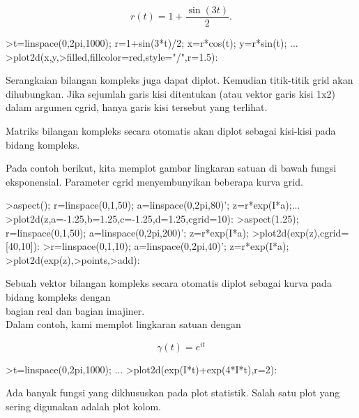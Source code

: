 \documentclass[a4paper,10pt]{article}
\begin{document}
\begin{eulernotebook}
\begin{eulercomment}
\begin{eulercomment}
\begin{eulercomment}
\begin{eulercomment}
\begin{eulercomment}
\begin{eulercomment}
\begin{eulercomment}
\begin{eulercomment}
\begin{eulercomment}
\begin{eulercomment}
\begin{eulercomment}
\end{eulercomment}
\begin{eulerformula}
\[
r(t) = 1 + \dfrac{\sin(3t)}{2}.
\]
\end{eulerformula}
\begin{eulerprompt}
>t=linspace(0,2pi,1000); r=1+sin(3*t)/2; x=r*cos(t); y=r*sin(t); ...
>plot2d(x,y,>filled,fillcolor=red,style="/",r=1.5):
\end{eulerprompt}
\begin{eulercomment}
Serangkaian bilangan kompleks juga dapat diplot. Kemudian titik-titik
grid akan dihubungkan. Jika sejumlah garis kisi ditentukan (atau
vektor garis kisi 1x2) dalam argumen cgrid, hanya garis kisi tersebut
yang terlihat.

Matriks bilangan kompleks secara otomatis akan diplot sebagai
kisi-kisi pada bidang kompleks.

Pada contoh berikut, kita memplot gambar lingkaran satuan di bawah
fungsi eksponensial. Parameter cgrid menyembunyikan beberapa kurva
grid.
\end{eulercomment}
\begin{eulerprompt}
>aspect(); r=linspace(0,1,50); a=linspace(0,2pi,80)'; z=r*exp(I*a);...
>plot2d(z,a=-1.25,b=1.25,c=-1.25,d=1.25,cgrid=10):
>aspect(1.25); r=linspace(0,1,50); a=linspace(0,2pi,200)'; z=r*exp(I*a);
>plot2d(exp(z),cgrid=[40,10]):
>r=linspace(0,1,10); a=linspace(0,2pi,40)'; z=r*exp(I*a);
>plot2d(exp(z),>points,>add):
\end{eulerprompt}
\begin{eulercomment}
Sebuah vektor bilangan kompleks secara otomatis diplot sebagai kurva
pada bidang kompleks dengan\\
bagian real dan bagian imajiner.\\
Dalam contoh, kami memplot lingkaran satuan dengan

\end{eulercomment}
\begin{eulerformula}
\[
\gamma(t) = e^{it}
\]
\end{eulerformula}
\begin{eulerprompt}
>t=linspace(0,2pi,1000); ...
>plot2d(exp(I*t)+exp(4*I*t),r=2):
\end{eulerprompt}
\begin{eulercomment}
Ada banyak fungsi yang dikhususkan pada plot statistik. Salah satu
plot yang sering digunakan adalah plot kolom.


\end{eulercomment}
\end{eulercomment}
\end{eulercomment}
\end{eulercomment}
\end{eulercomment}
\end{eulercomment}
\end{eulercomment}
\end{eulercomment}
\end{eulercomment}
\end{eulercomment}
\end{eulercomment}
\end{eulernotebook}
\end{document}
